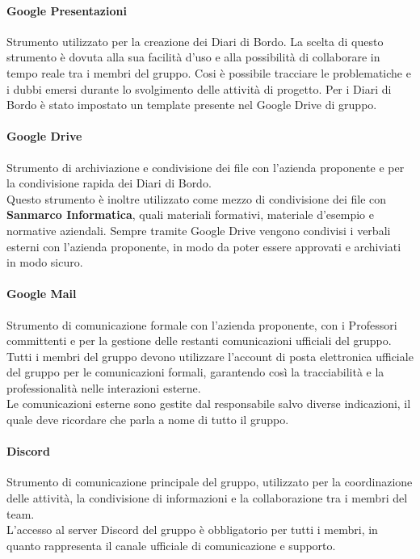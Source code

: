 \documentclass[a4paper,12pt]{article}
\begin{document}
\paragraph{Google Presentazioni}
Strumento utilizzato per la creazione dei Diari di Bordo. La scelta di
questo strumento è dovuta alla sua facilità d'uso e alla possibilità di
collaborare in tempo reale tra i membri del gruppo.
Cosi è possibile tracciare le problematiche e i dubbi emersi durante lo
svolgimento delle attività di progetto.
Per i Diari di Bordo è stato impostato un template presente nel Google Drive di gruppo.

\paragraph{Google Drive}
Strumento di archiviazione e condivisione dei file con l'azienda proponente e per la condivisione rapida dei Diari di Bordo.
\\ Questo strumento è inoltre utilizzato come mezzo di condivisione dei file con \textbf{Sanmarco Informatica}, quali materiali formativi, materiale d'esempio e normative aziendali.
Sempre tramite Google Drive vengono condivisi i verbali esterni con l'azienda proponente, in modo da poter essere approvati e archiviati in modo sicuro.

\paragraph{Google Mail}
Strumento di comunicazione formale con l'azienda proponente, con i Professori committenti e per la gestione delle restanti comunicazioni ufficiali del gruppo.\\
Tutti i membri del gruppo devono utilizzare l'account di posta elettronica ufficiale del gruppo per le comunicazioni formali, garantendo così la tracciabilità e 
la professionalità nelle interazioni esterne.\\
Le comunicazioni esterne sono gestite dal responsabile salvo diverse indicazioni, il quale deve ricordare che parla a nome di tutto il gruppo.

\paragraph{Discord}
Strumento di comunicazione principale del gruppo, utilizzato per la coordinazione delle attività, la condivisione di informazioni e la
collaborazione tra i membri del team.\\
L'accesso al server Discord del gruppo è obbligatorio per tutti i membri, in quanto rappresenta il canale ufficiale di comunicazione e supporto.
\end{document}
